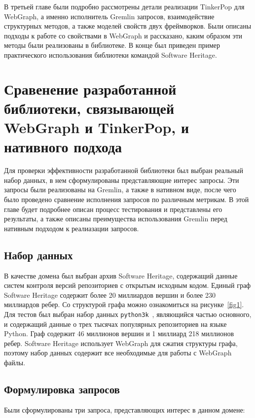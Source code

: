 \documentclass[times,specification,annotation]{itmo-student-thesis}
\begin{document}
\chapterconclusion

В третьей главе были подробно рассмотрены детали реализации TinkerPop для WebGraph, а именно исполнитель Gremlin запросов, взаимодействие структурных методов, а также моделей свойств двух фреймворков. Были описаны подходы к работе со свойствами в WebGraph и рассказано, каким образом эти методы были реализованы в библиотеке. В конце был приведен пример практического использования библиотеки командой Software Heritage.

\chapter{Сравенение разработанной библиотеки, связывающей WebGraph и TinkerPop, и нативного подхода}

Для проверки эффективности разработанной библиотеки был выбран реальный набор данных, в нем сформулированы представляющие интерес запросы. Эти запросы были реализованы на Gremlin, а также в нативном виде, после чего было проведено сравнение исполнения запросов по различным метрикам. В этой главе будет подробнее описан процесс тестирования и представлены его результаты, а также описаны преимущества использования Gremlin перед нативным подходом к реалиазации запросов.

\section{Набор данных}

В качестве домена был выбран архив Software Heritage, содержащий данные систем контроля версий репозиториев с открытым исходным кодом. Единый граф Software Heritage содержит более 20 миллиардов вершин и более 230 миллиардов ребер. Со структурой графа можно ознакомиться на рисунке~\ref{fig1}. Для тестов был выбран набор данных \texttt{python3k}~\cite{swh-dataset}, являющийся частью основного, и содержащий данные о трех тысячах популярных репозиториев на языке Python. Граф содержит 46 миллионов вершин и 1 миллиард 218 миллионов ребер. Software Heritage использует WebGraph для сжатия структуры графа, поэтому набор данных содержит все необходимые для работы с WebGraph файлы.

\section{Формулировка запросов}

Были сформулированы три запроса, представляющих интерес в данном домене:
\end{document}
